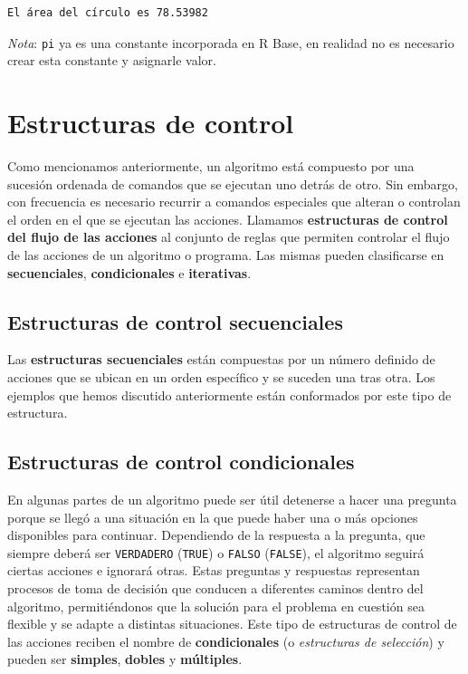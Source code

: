 \documentclass[
]{book}
\begin{document}
\begin{verbatim}
El área del círculo es 78.53982
\end{verbatim}

\emph{Nota}: \texttt{pi} ya es una constante incorporada en R Base, en realidad no es necesario crear esta constante y asignarle valor.

\hypertarget{estructuras-de-control}{%
\chapter{Estructuras de control}\label{estructuras-de-control}}

Como mencionamos anteriormente, un algoritmo está compuesto por una sucesión ordenada de comandos que se ejecutan uno detrás de otro. Sin embargo, con frecuencia es necesario recurrir a comandos especiales que alteran o controlan el orden en el que se ejecutan las acciones. Llamamos \textbf{estructuras de control del flujo de las acciones} al conjunto de reglas que permiten controlar el flujo de las acciones de un algoritmo o programa. Las mismas pueden clasificarse en \textbf{secuenciales}, \textbf{condicionales} e \textbf{iterativas}.

\hypertarget{estructuras-de-control-secuenciales}{%
\section{Estructuras de control secuenciales}\label{estructuras-de-control-secuenciales}}

Las \textbf{estructuras secuenciales} están compuestas por un número definido de acciones que se ubican en un orden específico y se suceden una tras otra. Los ejemplos que hemos discutido anteriormente están conformados por este tipo de estructura.

\hypertarget{estructuras-de-control-condicionales}{%
\section{Estructuras de control condicionales}\label{estructuras-de-control-condicionales}}

En algunas partes de un algoritmo puede ser útil detenerse a hacer una pregunta porque se llegó a una situación en la que puede haber una o más opciones disponibles para continuar. Dependiendo de la respuesta a la pregunta, que siempre deberá ser \texttt{VERDADERO} (\texttt{TRUE}) o \texttt{FALSO} (\texttt{FALSE}), el algoritmo seguirá ciertas acciones e ignorará otras. Estas preguntas y respuestas representan procesos de toma de decisión que conducen a diferentes caminos dentro del algoritmo, permitiéndonos que la solución para el problema en cuestión sea flexible y se adapte a distintas situaciones. Este tipo de estructuras de control de las acciones reciben el nombre de \textbf{condicionales} (o \emph{estructuras de selección}) y pueden ser \textbf{simples}, \textbf{dobles} y \textbf{múltiples}.
\end{document}
